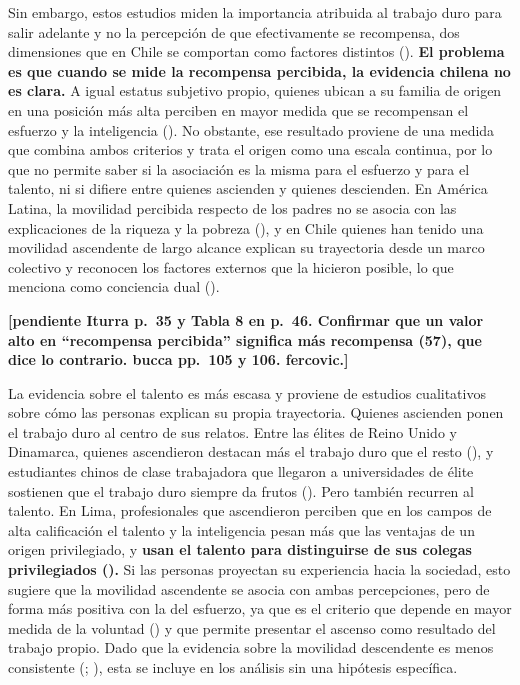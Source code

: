\documentclass[
  spanish,
  a4paper,
  oneside]{scrbook}
\begin{document}
Sin embargo, estos estudios miden la importancia atribuida al trabajo
duro para salir adelante y no la percepción de que efectivamente se
recompensa, dos dimensiones que en Chile se comportan como factores
distintos (). \textbf{El problema es que cuando se mide la recompensa
percibida, la evidencia chilena no es clara.} A igual estatus subjetivo
propio, quienes ubican a su familia de origen en una posición más alta
perciben en mayor medida que se recompensan el esfuerzo y la
inteligencia (). No obstante, ese resultado proviene de una
medida que combina ambos criterios y trata el origen como una escala
continua, por lo que no permite saber si la asociación es la misma para
el esfuerzo y para el talento, ni si difiere entre quienes ascienden y
quienes descienden. En América Latina, la movilidad percibida respecto
de los padres no se asocia con las explicaciones de la riqueza y la
pobreza (), y
en Chile quienes han tenido una movilidad ascendente de largo alcance
explican su trayectoria desde un marco colectivo y reconocen los
factores externos que la hicieron posible, lo que menciona como
conciencia dual ().

\textbf{{[}pendiente Iturra p.~35 y Tabla 8 en p.~46. Confirmar que un
valor alto en ``recompensa percibida'' significa más recompensa (57),
que dice lo contrario. bucca pp.~105 y 106. fercovic.{]}}

La evidencia sobre el talento es más escasa y proviene de estudios
cualitativos sobre cómo las personas explican su propia trayectoria.
Quienes ascienden ponen el trabajo duro al centro de sus relatos. Entre
las élites de Reino Unido y Dinamarca, quienes ascendieron destacan más
el trabajo duro que el resto
(), y
estudiantes chinos de clase trabajadora que llegaron a universidades de
élite sostienen que el trabajo duro siempre da frutos
(). Pero
también recurren al talento. En Lima, profesionales que ascendieron
perciben que en los campos de alta calificación el talento y la
inteligencia pesan más que las ventajas de un origen privilegiado, y
\textbf{usan el talento para distinguirse de sus colegas privilegiados
().} Si las
personas proyectan su experiencia hacia la sociedad, esto sugiere que la
movilidad ascendente se asocia con ambas percepciones, pero de forma más
positiva con la del esfuerzo, ya que es el criterio que depende en mayor
medida de la voluntad
() y
que permite presentar el ascenso como resultado del trabajo propio. Dado
que la evidencia sobre la movilidad descendente es menos consistente
(;
), esta se incluye en los análisis sin una
hipótesis específica.
\end{document}
